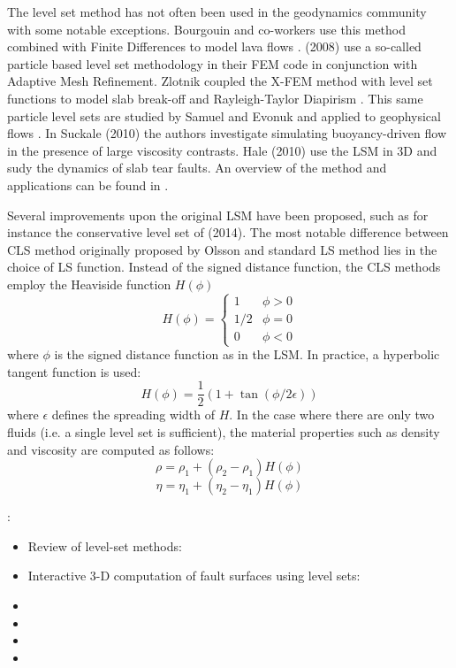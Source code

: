 The level set method has not often been used in the geodynamics 
community with some notable exceptions.
Bourgouin and co-workers use this method combined with Finite Differences to model 
lava flows \cite{bomh06,bomh07,habm07,grbh07}.
\textcite{brtf08} (2008) use a so-called particle based level set methodology in their 
FEM code in conjunction with Adaptive Mesh Refinement.
Zlotnik \etal coupled the X-FEM method with level set functions to model 
slab break-off and Rayleigh-Taylor Diapirism \cite{zlfd08}.
This same particle level sets are studied by Samuel and Evonuk and applied to geophysical flows \cite{saev10}. 
In Suckale \etal (2010) \cite{sunh10,suhe10} the authors investigate simulating 
buoyancy-driven flow in the presence of large viscosity contrasts.
Hale \etal (2010) \cite{hagr10} use the LSM in 3D and sudy the dynamics of slab tear faults.
An overview of the method and applications can
be found in \cite{osfe01}.

Several improvements upon the original LSM have been proposed, 
such as for instance the conservative level set of \textcite{zhbl14} (2014).
The most notable difference between CLS method originally proposed by 
Olsson \etal \cite{olkr05,olkz07}
and standard LS method lies in the choice of LS function. Instead of the signed distance function, the
CLS methods employ the Heaviside function $H(\phi)$ 
\[
H(\phi)=
\left\{
\begin{array}{ll}
1 & \phi>0 \\
1/2 & \phi=0 \\
0 & \phi<0
\end{array}
\right.
\]
where $\phi$ is the signed distance function as in the LSM. 
In practice, a hyperbolic tangent function is used:
\[
H(\phi) = \frac{1}{2} (1+\tan (\phi/2\epsilon))
\]
where $\epsilon$ defines the spreading width of $H$. In the case where there are only 
two fluids (i.e. a single level set is sufficient), the material properties such as density and viscosity
are computed as follows:
\[
\rho=\rho_1+(\rho_2-\rho_1)H(\phi)
\]
\[
\eta=\eta_1+(\eta_2-\eta_1)H(\phi)
\]

\Literature:
\begin{itemize}
\item Review of level-set methods: 
\item Interactive 3-D computation of fault surfaces using level sets: 
\item {}
\item {}
\item {}
\item {} 
\end{itemize}





